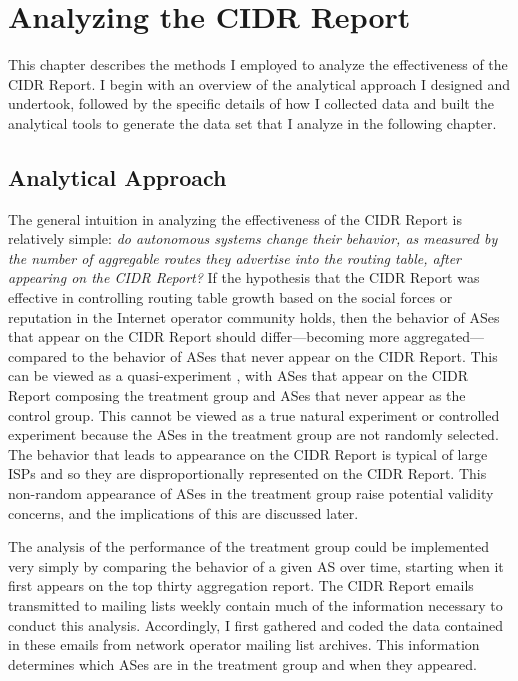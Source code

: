 \chapter{Analyzing the CIDR Report}
\label{chap:method}

This chapter describes the methods I employed to analyze the effectiveness of the CIDR Report. I begin with an overview of the analytical approach I designed and undertook, followed by the specific details of how I collected data and built the analytical tools to generate the data set that I analyze in the following chapter.

\section{Analytical Approach}


The general intuition in analyzing the effectiveness of the CIDR Report is relatively simple: \emph{do autonomous systems change their behavior, as measured by the number of aggregable routes they advertise into the routing table, after appearing on the CIDR Report?} If the hypothesis that the CIDR Report was effective in controlling routing table growth based on the social forces or reputation in the Internet operator community holds, then the behavior of ASes that appear on the CIDR Report should differ---becoming more aggregated---compared to the behavior of ASes that never appear on the CIDR Report. This can be viewed as a quasi-experiment \cite{Babbie:2003uq}, with ASes that appear on the CIDR Report composing the treatment group and ASes that never appear as the control group. This cannot be viewed as a true natural experiment or controlled experiment because the ASes in the treatment group are not randomly selected. The behavior that leads to appearance on the CIDR Report is typical of large ISPs and so they are disproportionally represented on the CIDR Report. This non-random appearance of ASes in the treatment group raise potential validity concerns, and the implications of this are discussed later.

The analysis of the performance of the treatment group could be implemented very simply by comparing the behavior of a given AS over time, starting when it first appears on the top thirty aggregation report. The CIDR Report emails transmitted to mailing lists weekly contain much of the information necessary to conduct this analysis. Accordingly, I first gathered and coded the data contained in these emails from network operator mailing list archives. This information determines which ASes are in the treatment group and when they appeared.


